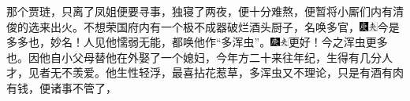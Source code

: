 {那个贾琏，只离了凤姐便要寻事，独寝了两夜，便十分难熬，便暂将小厮们内有清俊的选来出火。不想荣国府内有一个极不成器破烂酒头厨子，名唤多官，{\includegraphics[width=3mm]{../Images/00004}\includegraphics[width=3mm]{../Images/00012}\footnotesize \kaishu 今是多多也，妙名！}人见他懦弱无能，都唤他作``多浑虫''。{\includegraphics[width=3mm]{../Images/00004}\includegraphics[width=3mm]{../Images/00012}\footnotesize \kaishu 更好！今之浑虫更多也。}因他自小父母替他在外娶了一个媳妇，今年方二十来往年纪，生得有几分人才，见者无不羡爱。他生性轻浮，最喜拈花惹草，多浑虫又不理论，只是有酒有肉有钱，便诸事不管了，}
